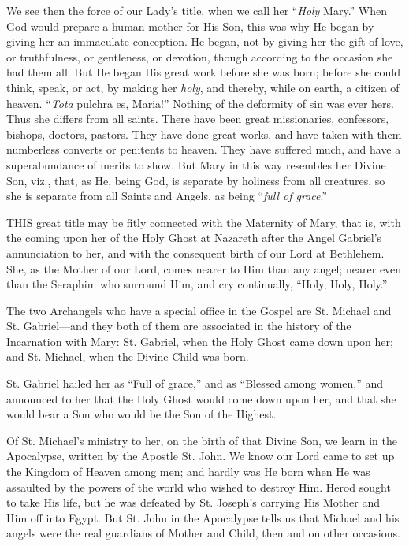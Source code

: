 We see then the force of our
Lady's title, when we call her ``\emph{Holy} Mary.'' When God would
prepare a human mother for His Son, this was why He began by giving
her an immaculate conception. He began, not by giving her the gift of
love, or truthfulness, or gentleness, or devotion, though according to
the occasion she had them all. But He began His great work before she
was born; before she could think, speak, or act, by making her \emph{holy},
and thereby, while on earth, a citizen of heaven. ``\emph{Tota} pulchra
es, Maria!'' Nothing of the deformity of sin was ever hers. Thus she
differs from all saints. There have been great missionaries, confessors,
bishops, doctors, pastors. They have done great works, and have taken
with them numberless converts or penitents to heaven. They have suffered
much, and have a superabundance of merits to show. But Mary in this way
resembles her Divine Son, viz., that, as He, being God, is separate by
holiness from all creatures, so she is separate from all Saints and
Angels, as being ``\emph{full of grace}.''



THIS
great title may be fitly connected with the Maternity of Mary, that is,
with the coming upon her of the Holy Ghost at Nazareth after the Angel
Gabriel's annunciation to her, and with the consequent birth of our Lord
at Bethlehem. She, as the Mother of our Lord, comes nearer to Him than
any angel; nearer even than the Seraphim who surround Him, and cry
continually, ``Holy, Holy, Holy.''

The two Archangels who have a
special office in the Gospel are St. Michael and St. Gabriel—and they
both of them are associated in the history of the Incarnation with Mary:
St. Gabriel, when the Holy Ghost came down upon her; and St. Michael,
when the Divine Child was born.

St. Gabriel hailed her as ``Full
of grace,'' and as ``Blessed among women,'' and announced to her that the
Holy Ghost would come down upon her, and that she would bear a Son
who would be the Son of the Highest.

Of St. Michael's ministry to
her, on the birth of that Divine Son, we learn in the Apocalypse,
written by the Apostle St. John. We know our Lord came to set up the
Kingdom of Heaven among men; and hardly was He born when He was
assaulted by the powers of the world who wished to destroy Him. Herod
sought to take His life, but he was defeated by St. Joseph's carrying
His Mother and Him off into Egypt. But St. John in the Apocalypse tells
us that Michael and his angels were the real guardians of Mother and
Child, then and on other occasions.

